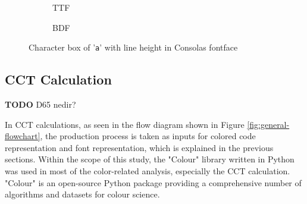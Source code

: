 \documentclass{article}
\begin{document}

\begin{figure}[htbp]
  \begin{subfigure}{0.48\textwidth}
    \centering
    

    \caption{TTF}
    \label{fig:charbox_TTF}
  \end{subfigure}
  \begin{subfigure}{0.48\textwidth}
    \centering

    \caption{BDF}
    \label{fig:charbox_BDF}
  \end{subfigure}

  \caption{Character box of '\texttt{a}' with line height in Consolas fontface}
  \label{fig:charbox}
\end{figure}

\subsection{CCT Calculation}

\textbf{TODO} D65 nedir?

In CCT calculations, as seen in the flow diagram shown in Figure  \ref{fig:general-flowchart}, the production process is
taken as inputs for colored code representation and font representation, which is explained in the previous sections.
Within the scope of this study, the "Colour" library \cite{colour2022package} written in Python was used in most of the
color-related analysis, especially the CCT calculation.  "Colour" is an open-source Python package providing a comprehensive number of algorithms and datasets for colour science.
\end{document}
